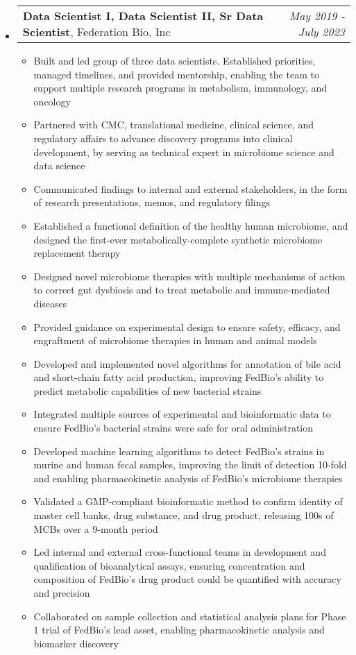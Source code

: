\documentclass[letterpaper,10pt]{article}
\makeatletter
\newcommand{\ressubheadingSingular}[2]{
\begin{tabular*}{7in}{l@{\cftdotfill{\cftsecdotsep}\extracolsep{\fill}}r}
		#1 & \textit{#2} \\
\end{tabular*}\vspace{-6pt}}
\makeatother
\begin{document}
\begin{itemize}
	\item
		\ressubheadingSingular{\textbf{Data Scientist I, Data Scientist II, Sr Data Scientist}, Federation Bio, Inc}{May 2019 - July 2023}
		\begin{itemize}
		
			\item Built and led group of three data scientists. Established priorities, managed timelines, and provided mentorship, enabling the team to support multiple research programs in metabolism, immunology, and oncology
			\item Partnered with CMC, translational medicine, clinical science, and regulatory affairs to advance discovery programs into clinical development, by serving as technical expert in microbiome science and data science
			\item Communicated findings to internal and external stakeholders, in the form of research presentations, memos, and regulatory filings

			\item Established a functional definition of the healthy human microbiome, and designed the first-ever metabolically-complete synthetic microbiome replacement therapy
			\item Designed novel microbiome therapies with multiple mechanisms of action to correct gut dysbiosis and to treat metabolic and immune-mediated diseases
			\item Provided guidance on experimental design to ensure safety, efficacy, and engraftment of microbiome therapies in human and animal models
			\item Developed and implemented novel algorithms for annotation of bile acid and short-chain fatty acid production, improving FedBio's ability to predict metabolic capabilities of new bacterial strains
			\item Integrated multiple sources of experimental and bioinformatic data to ensure FedBio's bacterial strains were safe for oral administration
			\item Developed machine learning algorithms to detect FedBio's strains in murine and human fecal samples, improving the limit of detection 10-fold and enabling pharmacokinetic analysis of FedBio's microbiome therapies
			\item Validated a GMP-compliant bioinformatic method to confirm identity of master cell banks, drug substance, and drug product, releasing 100s of MCBs over a 9-month period
			\item Led internal and external cross-functional teams in development and qualification of bioanalytical assays, ensuring concentration and composition of FedBio's drug product could be quantified with accuracy and precision
			\item Collaborated on sample collection and statistical analysis plans for Phase 1 trial of FedBio's lead asset, enabling pharmacokinetic analysis and biomarker discovery
			

\end{itemize}
\end{itemize}
\end{document}
